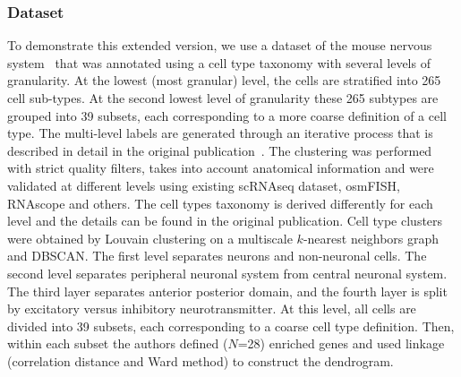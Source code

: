 \subsubsection{Dataset}
To demonstrate this extended version, we use a dataset of the mouse nervous system~\cite{zeisel2018} that was annotated using a cell type taxonomy with several levels of granularity. At the lowest (most granular) level, the cells are stratified into 265 cell sub-types. At the second lowest level of granularity these 265 subtypes are grouped into 39 subsets, each corresponding to a more coarse definition of a cell type. The multi-level labels are generated through an iterative process that is described in detail in the original publication~\cite{zeisel2018}. The clustering was performed with strict quality filters, takes into account anatomical information and were validated at different levels using existing scRNAseq dataset, osmFISH, RNAscope and others. The cell types taxonomy is derived differently for each level and the details can be found in the original publication. Cell type clusters were obtained by Louvain clustering on a multiscale $k$-nearest neighbors graph and DBSCAN. The first level separates neurons and non-neuronal cells. The second level separates peripheral neuronal system from central neuronal system. The third layer separates anterior posterior domain, and the fourth layer is split by excitatory versus inhibitory neurotransmitter. At this level, all cells are divided into 39 subsets, each corresponding to a coarse cell type definition. Then, within each subset the authors defined ($N$=28) enriched genes and used linkage (correlation distance and Ward method) to construct the dendrogram.

